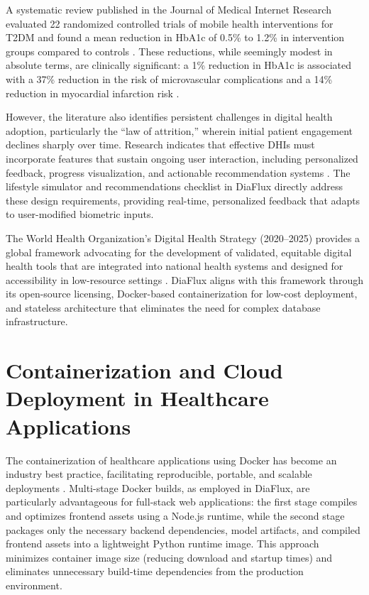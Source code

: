 \documentclass[12pt,a4paper]{report}
\begin{document}
A systematic review published in the Journal of Medical Internet Research evaluated 22 randomized controlled trials of mobile health interventions for T2DM and found a mean reduction in HbA1c of 0.5\% to 1.2\% in intervention groups compared to controls \cite{jmir_mhealth}. These reductions, while seemingly modest in absolute terms, are clinically significant: a 1\% reduction in HbA1c is associated with a 37\% reduction in the risk of microvascular complications and a 14\% reduction in myocardial infarction risk \cite{ada_standards_2023}.

However, the literature also identifies persistent challenges in digital health adoption, particularly the ``law of attrition,'' wherein initial patient engagement declines sharply over time. Research indicates that effective DHIs must incorporate features that sustain ongoing user interaction, including personalized feedback, progress visualization, and actionable recommendation systems \cite{who_dhi_report}. The lifestyle simulator and recommendations checklist in DiaFlux directly address these design requirements, providing real-time, personalized feedback that adapts to user-modified biometric inputs.

The World Health Organization's Digital Health Strategy (2020--2025) provides a global framework advocating for the development of validated, equitable digital health tools that are integrated into national health systems and designed for accessibility in low-resource settings \cite{who_dhi_report}. DiaFlux aligns with this framework through its open-source licensing, Docker-based containerization for low-cost deployment, and stateless architecture that eliminates the need for complex database infrastructure.

\section{Containerization and Cloud Deployment in Healthcare Applications}
The containerization of healthcare applications using Docker has become an industry best practice, facilitating reproducible, portable, and scalable deployments \cite{docker_doc}. Multi-stage Docker builds, as employed in DiaFlux, are particularly advantageous for full-stack web applications: the first stage compiles and optimizes frontend assets using a Node.js runtime, while the second stage packages only the necessary backend dependencies, model artifacts, and compiled frontend assets into a lightweight Python runtime image. This approach minimizes container image size (reducing download and startup times) and eliminates unnecessary build-time dependencies from the production environment.
\end{document}
